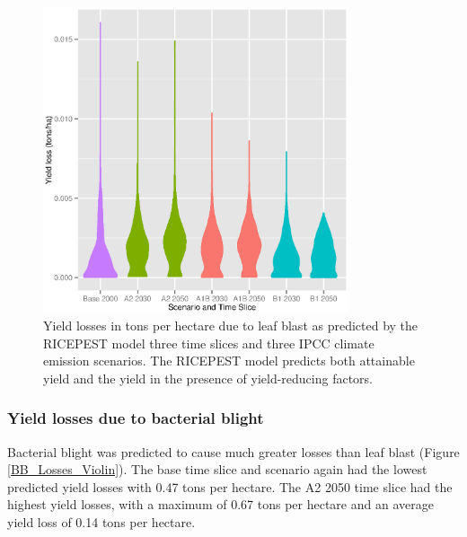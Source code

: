 \documentclass[preprint,12pt]{elsarticle}
\begin{document}
\begin{figure}[H]
  \includegraphics[width = 90mm]{Figures/LB_Losses_Violin}
  \caption{Yield losses in tons per hectare due to leaf blast as predicted by the RICEPEST model three time slices and three IPCC climate emission scenarios. The RICEPEST model predicts both attainable yield and the yield in the presence of yield-reducing factors.}
  \label{LB_Losses_Violin}
\end{figure}

\subsubsection{Yield losses due to bacterial blight}
Bacterial blight was predicted to cause much greater losses than leaf blast (Figure \ref{BB_Losses_Violin}). The base time slice and scenario again had the lowest predicted yield losses with 0.47 tons per hectare. The A2 2050 time slice had the highest yield losses, with a maximum of 0.67 tons per hectare and an average yield loss of 0.14 tons per hectare.
\end{document}
